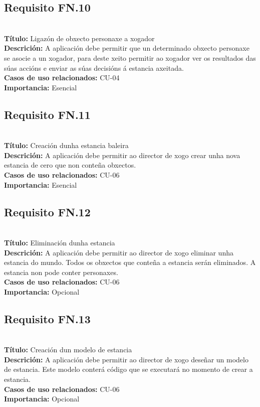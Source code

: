 \subsection{Requisito FN.10}~\\
{\bf Título:} Ligazón de obxecto personaxe a xogador\\
{\bf Descrición:} A aplicación debe permitir que un determinado obxecto personaxe se asocie a un xogador, para deste xeito permitir ao xogador ver os resultados das súas accións e enviar as súas decisións á estancia axeitada.\\
{\bf Casos de uso relacionados:} CU-04\\
{\bf Importancia:} Esencial

\subsection{Requisito FN.11}~\\
{\bf Título:} Creación dunha estancia baleira\\
{\bf Descrición:} A aplicación debe permitir ao director de xogo crear unha nova estancia de cero que non conteña obxectos.\\
{\bf Casos de uso relacionados:} CU-06\\
{\bf Importancia:} Esencial

\subsection{Requisito FN.12}~\\
{\bf Título:} Eliminación dunha estancia\\
{\bf Descrición:} A aplicación debe permitir ao director de xogo eliminar unha estancia do mundo. Todos os obxectos que conteña a estancia serán eliminados. A estancia non pode conter personaxes.\\
{\bf Casos de uso relacionados:} CU-06\\
{\bf Importancia:} Opcional

\subsection{Requisito FN.13}~\\
{\bf Título:} Creación dun modelo de estancia\\
{\bf Descrición:} A aplicación debe permitir ao director de xogo deseñar un modelo de estancia. Este modelo conterá código que se executará no momento de crear a estancia.\\
{\bf Casos de uso relacionados:} CU-06\\
{\bf Importancia:} Opcional


